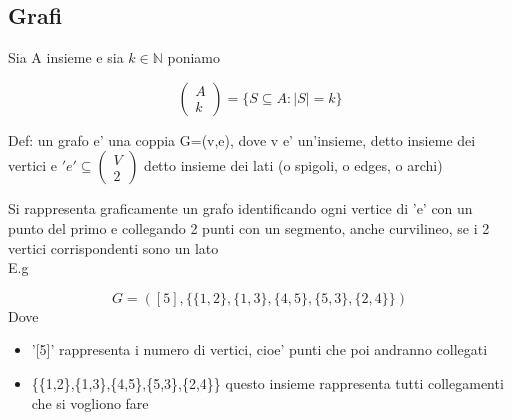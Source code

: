 \documentclass{article}
\begin{document}
        \subsection{Grafi}
        \begin{flushleft}
          Sia A insieme e sia $k\in \mathbb{N}$ poniamo
        \end{flushleft}
        \begin{equation*}
          \begin{pmatrix}
            A \\ 
            k
          \end{pmatrix}= \{ S \subseteq A: \mid S \mid  =k \}
        \end{equation*}
        \begin{flushleft}
          Def: un grafo e' una coppia G=(v,e), dove v e' un'insieme, detto insieme dei vertici e $'e' \subseteq \begin{pmatrix} V \\ 2\end{pmatrix}$
          detto insieme dei lati (o spigoli, o edges, o archi)
        \end{flushleft}
        \begin{flushleft}
          Si rappresenta graficamente un grafo identificando ogni vertice di 'e' con un punto del primo e collegando 2 punti con un segmento, anche
          curvilineo, se i 2 vertici corrispondenti sono un lato \\
          E.g
        \end{flushleft}
        \begin{equation*}
          G=([5],\{\{1,2\},\{1,3\},\{4,5\},\{5,3\},\{2,4\}\})
        \end{equation*}
        Dove
        \begin{itemize}
          \item '[5]' rappresenta i numero di vertici, cioe' punti che poi andranno collegati
          \item \{\{1,2\},\{1,3\},\{4,5\},\{5,3\},\{2,4\}\} questo insieme rappresenta tutti collegamenti che si vogliono fare
        \end{itemize}
\end{document}

